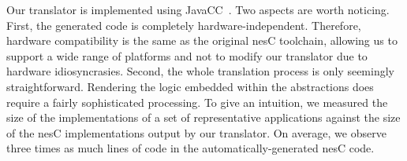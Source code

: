 Our translator is implemented using JavaCC~\cite{javacc}. Two aspects
are worth noticing. First, the generated code is completely
hardware-independent. Therefore, hardware compatibility is the same as
the original nesC toolchain, allowing us to support a wide range of
platforms and not to modify our translator due to hardware
idiosyncrasies. Second, the whole translation process is only
seemingly straightforward. Rendering the logic embedded within the
\conesc abstractions does require a fairly sophisticated
processing. To give an intuition, we measured the size of the \conesc
implementations of a set of representative applications against the
size of the nesC implementations output by our translator. On average,
we observe three times as much lines of code in the
automatically-generated nesC code.

